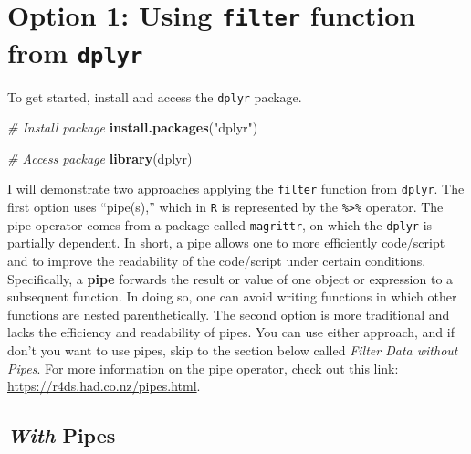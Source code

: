 \documentclass[]{book}
\newenvironment{Shaded}{\begin{snugshade}}{\end{snugshade}}
\newcommand{\KeywordTok}[1]{\textcolor[rgb]{0.13,0.29,0.53}{\textbf{#1}}}
\newcommand{\StringTok}[1]{\textcolor[rgb]{0.31,0.60,0.02}{#1}}
\newcommand{\CommentTok}[1]{\textcolor[rgb]{0.56,0.35,0.01}{\textit{#1}}}
\newcommand{\NormalTok}[1]{#1}
\begin{document}
\section{\texorpdfstring{Option 1: Using \texttt{filter} function from
\texttt{dplyr}}{Option 1: Using filter function from dplyr}}\label{option-1-using-filter-function-from-dplyr}

To get started, install and access the \texttt{dplyr} package.

\begin{Shaded}
\begin{Highlighting}[]
\CommentTok{# Install package}
\KeywordTok{install.packages}\NormalTok{(}\StringTok{"dplyr"}\NormalTok{)}
\end{Highlighting}
\end{Shaded}

\begin{Shaded}
\begin{Highlighting}[]
\CommentTok{# Access package}
\KeywordTok{library}\NormalTok{(dplyr)}
\end{Highlighting}
\end{Shaded}

I will demonstrate two approaches applying the \texttt{filter} function
from \texttt{dplyr}. The first option uses ``pipe(s),'' which in
\texttt{R} is represented by the \texttt{\%\textgreater{}\%} operator.
The pipe operator comes from a package called \texttt{magrittr}, on
which the \texttt{dplyr} is partially dependent. In short, a pipe allows
one to more efficiently code/script and to improve the readability of
the code/script under certain conditions. Specifically, a \textbf{pipe}
forwards the result or value of one object or expression to a subsequent
function. In doing so, one can avoid writing functions in which other
functions are nested parenthetically. The second option is more
traditional and lacks the efficiency and readability of pipes. You can
use either approach, and if don't you want to use pipes, skip to the
section below called \emph{Filter Data without Pipes}. For more
information on the pipe operator, check out this link:
\url{https://r4ds.had.co.nz/pipes.html}.

\subsection{\texorpdfstring{\emph{With}
Pipes}{With Pipes}}\label{with-pipes}
\end{document}

